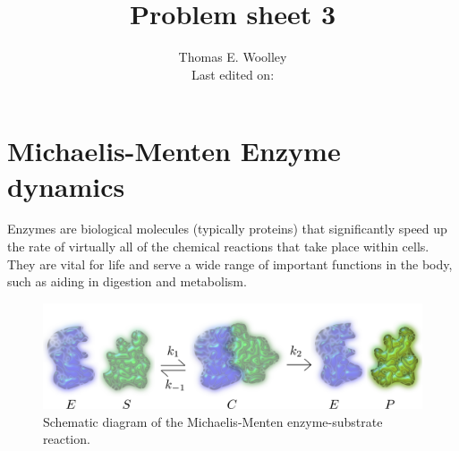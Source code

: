 \documentclass[]{article}
\begin{document}


\title{Problem sheet 3}
\author{Thomas E. Woolley\\Last edited on:}
\maketitle

\section{Michaelis-Menten Enzyme dynamics}
Enzymes are biological molecules (typically proteins) that significantly speed up the rate of virtually all of the chemical reactions that take place within cells. They are vital for life and serve a wide range of important functions in the body, such as aiding in digestion and metabolism.
\begin{figure}[h!!!tb]
\centering
\includegraphics[width=\textwidth]{../../Pictures/Michaelis-Menten_schematic.png}
\caption{\label{Michaelis-Menten_schematic} Schematic diagram of the Michaelis-Menten enzyme-substrate reaction.}
\end{figure}
\end{document}
